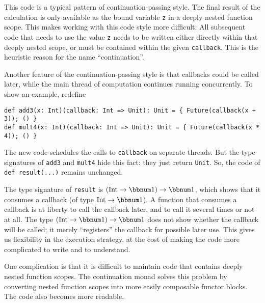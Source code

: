 \noindent This code is a typical pattern of continuation-passing style.
The final result of the calculation is only available as the bound
variable \lstinline!z! in a deeply nested function scope. This makes
working with this code style more difficult: All subsequent code that
needs to use the value \lstinline!z! needs to be written either directly
within that deeply nested scope, or must be contained within the given
\lstinline!callback!. This is the heuristic reason for the name \textsf{``}continuation\textsf{''}.

Another feature of the continuation-passing style is that callbacks
could be called later, while the main thread of computation continues
running concurrently. To show an example, redefine
\begin{lstlisting}
def add3(x: Int)(callback: Int => Unit): Unit = { Future(callback(x + 3)); () }
def mult4(x: Int)(callback: Int => Unit): Unit = { Future(callback(x * 4)); () }
\end{lstlisting}
The new code schedules the calls to \lstinline!callback! on separate
threads. But the type signatures of \lstinline!add3! and \lstinline!mult4!
hide this fact: they just return \lstinline!Unit!. So, the code of
\lstinline!def result(...)! remains unchanged.

The type signature of \lstinline!result! is $\left(\text{Int}\rightarrow\bbnum 1\right)\rightarrow\bbnum 1$,
which shows that it consumes a callback (of type $\text{Int}\rightarrow\bbnum 1$).
A function that consumes a callback is at liberty to call the callback
later, and to call it several times or not at all. The type $\left(\text{Int}\rightarrow\bbnum 1\right)\rightarrow\bbnum 1$
does not show whether the callback will be called; it merely \textsf{``}registers\textsf{''}
the callback for possible later use. This gives us flexibility in
the execution strategy, at the cost of making the code more complicated
to write and to understand.

One complication is that it is difficult to maintain code that contains
deeply nested function scopes. The continuation monad solves this
problem by converting nested function scopes into more easily composable
functor blocks. The code also becomes more readable.

